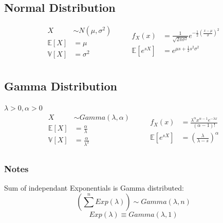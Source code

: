 \documentclass[12pt]{article}
\begin{document}
    \subsection{Normal Distribution}
    \begin{equation*}
        \begin{aligned}
            X &\sim N(\mu, \sigma^2) \qquad\\
            \mathbb{E}[X] &= \mu \\
            \mathbb{V}[X] &= \sigma^2 \\
        \end{aligned}
        \begin{aligned}
            f_X(x) &= \frac{1}{\sqrt{2\pi\sigma^2}} e^{-\frac{1}{2}\left(\frac{x - \mu}{\sigma}\right)^2} \\
            \mathbb{E}[e^{sX}] &= e^{\mu s + \frac{1}{2}s^2\sigma^2} \\
        \end{aligned}
    \end{equation*}

    \subsection{Gamma Distribution}
    \(\lambda > 0, \alpha > 0 \)
    \begin{equation*}
        \begin{aligned}
            X &\sim Gamma(\lambda, \alpha) \qquad\\
            \mathbb{E}[X] &= \frac{\alpha}{\lambda} \\
            \mathbb{V}[X] &= \frac{\alpha}{\lambda^2} \\
        \end{aligned}
        \begin{aligned}
            f_X(x) &= \frac{\lambda^\alpha x^{\alpha - 1} e^{-\lambda x}}{(\alpha - 1)!} \\
            \mathbb{E}[e^{sX}] &= \left(\frac{\lambda}{\lambda - s}\right)^\alpha \\
        \end{aligned}
    \end{equation*}

    \subsubsection{Notes}
    Sum of independant Exponentials is Gamma distributed:
    \begin{equation*}
        \left(\sum^{n} Exp(\lambda) \right) \sim Gamma(\lambda, n) 
    \end{equation*}
    \begin{equation*}
        Exp(\lambda) \equiv Gamma(\lambda, 1) 
    \end{equation*}
\end{document}
